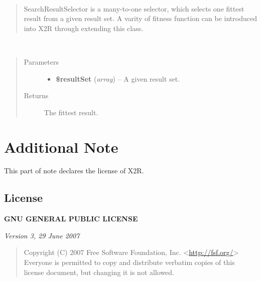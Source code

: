 \documentclass[letterpaper,10pt,english]{sphinxmanual}
\begin{document}
\begin{fulllineitems}
\label{docs/api:SearchResultSelector}~\begin{quote}

SearchResultSelector is a many-to-one selector, which selects one fittest result from a given result set. A varity of fitness function can be introduced into X2R through extending this class.
\end{quote}

\begin{fulllineitems}
\label{docs/api:SearchResultSelector::select}~\begin{quote}\begin{description}
\item[{Parameters}] \leavevmode\begin{itemize}
\item {} 
\textbf{\$resultSet} (\emph{array}) -- A given result set.

\end{itemize}

\item[{Returns}] \leavevmode
The fittest result.

\end{description}\end{quote}

\end{fulllineitems}


\end{fulllineitems}



\chapter{Additional Note}
\label{index:additional-note}
This part of note declares the license of X2R.


\section{License}
\label{docs/license::doc}\label{docs/license:license}\label{docs/license:id1}
\textbf{GNU GENERAL PUBLIC LICENSE}

\emph{Version 3, 29 June 2007}
\begin{quote}

Copyright (C) 2007 Free Software Foundation, Inc. \textless{}\href{http://fsf.org/}{http://fsf.org/}\textgreater{}
Everyone is permitted to copy and distribute verbatim copies
of this license document, but changing it is not allowed.
\end{quote}
\end{document}
